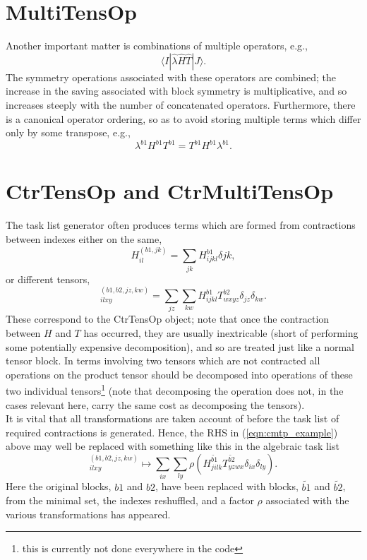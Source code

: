 \section{MultiTensOp } 
\noindent Another important matter is combinations of multiple operators, e.g.,
\begin{equation}
\langle I | \hat{\lambda}\hat{H}\hat{T} | J \rangle .
\end{equation}
The symmetry operations associated with these operators are combined; the increase in the saving
associated with block symmetry is multiplicative, and so increases steeply with
the number of concatenated operators. Furthermore, there is a canonical
operator ordering, so as to avoid storing multiple terms which differ only by some transpose, 
e.g., 
\begin{equation}
\lambda^{b1}H^{b1}T^{b1} = T^{b1}H^{b1}\lambda^{b1}. 
\label{eqn:tens_block_combined}
\end{equation}
\section{CtrTensOp and CtrMultiTensOp}
The task list generator often produces terms which are formed from contractions between indexes either
on the same,
\begin{equation*}
H^{(b1,jk)}_{il} = \sum_{jk} H^{b1}_{ijkl}\delta{jk},
\end{equation*}
or different tensors, 
\begin{equation}
[HT]^{(b1,b2,jz,kw)}_{ilxy} = \sum_{jz} \sum_{kw} H^{b1}_{ijkl}T^{b2}_{wxyz}\delta_{jz}\delta_{kw}.
\label{eqn:cmtp_example}
\end{equation}
These correspond to the CtrTensOp object; note that once the contraction between $H$ and $T$ has occurred, they
are usually inextricable (short of performing some potentially expensive decomposition), and so 
are treated just like a normal tensor block. In terms involving two
tensors which are not contracted all operations on the product tensor should be decomposed into operations of these 
two individual tensors\footnote{this is currently not done everywhere in the code} (note that decomposing the
operation does not, in the cases relevant here, carry the same cost as decomposing the tensors).\\

\noindent It is vital that all transformations are taken account of before the task list of required contractions
is generated. Hence, the RHS in (\ref{eqn:cmtp_example}) above may well be replaced with something like this in
the algebraic task list
\begin{equation}
[HT]^{(b1,b2,jz,kw)}_{ilxy} \mapsto \sum_{ix} \sum_{ly} \rho(H^{\tilde{b1}}_{jilk}T^{\tilde{b2}}_{yzwx}\delta_{ix}\delta_{ly}).
\label{eqn:cmtp_example_symm}
\end{equation}
\noindent Here the original blocks,  $b1$ and $b2$, have been replaced with blocks, $\tilde{b1}$ and $\tilde{b2}$,
from the minimal set, the indexes reshuffled, and a factor $\rho$ associated with the various transformations has appeared. 

